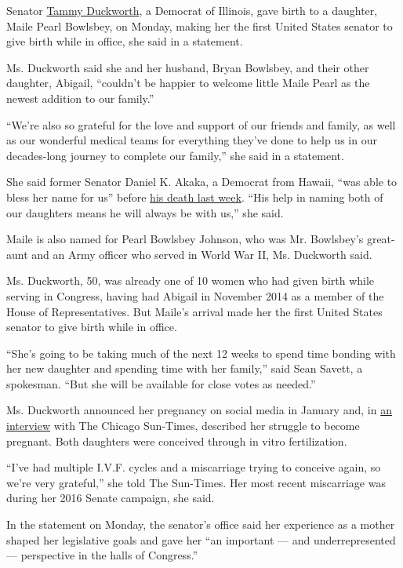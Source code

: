 Senator
\href{https://www.nytimes.com/2020/07/08/us/politics/tucker-carlson-tammy-duckworth.html}{Tammy
Duckworth}, a Democrat of Illinois, gave birth to a daughter, Maile
Pearl Bowlsbey, on Monday, making her the first United States senator to
give birth while in office, she said in a statement.

Ms. Duckworth said she and her husband, Bryan Bowlsbey, and their other
daughter, Abigail, ``couldn't be happier to welcome little Maile Pearl
as the newest addition to our family.''

``We're also so grateful for the love and support of our friends and
family, as well as our wonderful medical teams for everything they've
done to help us in our decades-long journey to complete our family,''
she said in a statement.

She said former Senator Daniel K. Akaka, a Democrat from Hawaii, ``was
able to bless her name for us'' before
\href{https://www.nytimes.com/2018/04/06/us/former-senator-daniel-akaka-dead.html}{his
death last week}. ``His help in naming both of our daughters means he
will always be with us,'' she said.

Maile is also named for Pearl Bowlsbey Johnson, who was Mr. Bowlsbey's
great-aunt and an Army officer who served in World War II, Ms. Duckworth
said.

Ms. Duckworth, 50, was already one of 10 women who had given birth while
serving in Congress, having had Abigail in November 2014 as a member of
the House of Representatives. But Maile's arrival made her the first
United States senator to give birth while in office.

``She's going to be taking much of the next 12 weeks to spend time
bonding with her new daughter and spending time with her family,'' said
Sean Savett, a spokesman. ``But she will be available for close votes as
needed.''

Ms. Duckworth announced her pregnancy on social media in January and, in
\href{https://chicago.suntimes.com/columnists/tammy-duckworth-pregnant-first-sitting-senator-give-birth/}{an
interview} with The Chicago Sun-Times, described her struggle to become
pregnant. Both daughters were conceived through in vitro fertilization.

``I've had multiple I.V.F. cycles and a miscarriage trying to conceive
again, so we're very grateful,'' she told The Sun-Times. Her most recent
miscarriage was during her 2016 Senate campaign, she said.

In the statement on Monday, the senator's office said her experience as
a mother shaped her legislative goals and gave her ``an important ---
and underrepresented --- perspective in the halls of Congress.''

